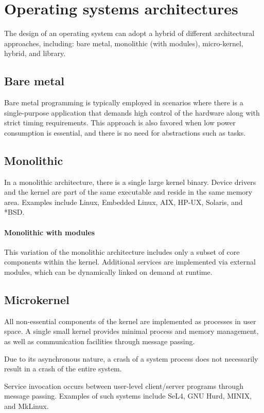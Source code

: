 \section{Operating systems architectures}

The design of an operating system can adopt a hybrid of different architectural approaches, including: bare metal, monolithic (with modules), micro-kernel, hybrid, and library.

\subsection{Bare metal}
Bare metal programming is typically employed in scenarios where there is a single-purpose application that demands high control of the hardware along with strict timing requirements. 
This approach is also favored when low power consumption is essential, and there is no need for abstractions such as tasks.

\subsection{Monolithic} 
In a monolithic architecture, there is a single large kernel binary. 
Device drivers and the kernel are part of the same executable and reside in the same memory area. 
Examples include Linux, Embedded Linux, AIX, HP-UX, Solaris, and *BSD.

\paragraph*{Monolithic with modules} 
This variation of the monolithic architecture includes only a subset of core components within the kernel. 
Additional services are implemented via external modules, which can be dynamically linked on demand at runtime.

\subsection{Microkernel}
All non-essential components of the kernel are implemented as processes in user space. 
A single small kernel provides minimal process and memory management, as well as communication facilities through message passing.

Due to its asynchronous nature, a crash of a system process does not necessarily result in a crash of the entire system.

Service invocation occurs between user-level client/server programs through message passing. 
Examples of such systems include SeL4, GNU Hurd, MINIX, and MkLinux.

